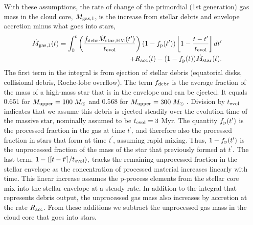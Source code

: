 \documentclass[12pt,preprint]{aastex}
\begin{document}
With these assumptions, the rate of change of the primordial (1st generation) gas
mass in the cloud core, $M_{\rm gas,1}$, is the increase from stellar debris and
envelope accretion minus what goes into stars,
\begin{eqnarray}
{\dot M}_{\rm gas,1}(t)=\int_0^t \left({{f_{\rm debr}{\dot M}_{\rm star,HM}(t^\prime)}\over{t_{\rm evol}}}
\right)\left(1-f_{\rm p}(t^\prime)\right)\left[1-{{t-t^\prime}\over{t_{\rm evol}}}\right]
dt^\prime\label{md1}\\
 +R_{\rm acc}(t)-(1-f_{\rm p}(t)){\dot M}_{\rm star}(t).
\nonumber
\end{eqnarray}
The first term in the integral is from ejection of stellar debris (equatorial
disks, collisional debris, Roche-lobe overflow). The term $f_{\rm debr}$ is the
average fraction of the mass of a high-mass star that is in the envelope and can be
ejected. It equals $0.651$ for $M_{\rm upper}=100\;M_\odot$ and $0.568$ for $M_{\rm
upper}=300\;M_\odot$ \citep{prantzos06}.  Division by $t_{\rm evol}$ indicates that
we assume this debris is ejected steadily over the evolution time of the massive
star, nominally assumed to be $t_{\rm evol}=3$ Myr. The quantity $f_{\rm
p}(t^\prime)$ is the processed fraction in the gas at time $t^\prime$, and
therefore also the processed fraction in stars that form at time $t^\prime$,
assuming rapid mixing. Thus, $1-f_{\rm p}(t^\prime)$ is the unprocessed fraction of
the mass of the star that previously formed at $t^\prime$. The last term,
$1-([t-t^\prime]/t_{\rm evol})$, tracks the remaining unprocessed fraction in the
stellar envelope as the concentration of processed material increases linearly with
time. This linear increase assumes the p-process elements from the stellar core mix
into the stellar envelope at a steady rate.  In addition to the integral that
represents debris output, the unprocessed gas mass also increases by accretion at
the rate $R_{\rm acc}$. From these additions we subtract the unprocessed gas mass
in the cloud core that goes into stars.
\end{document}
